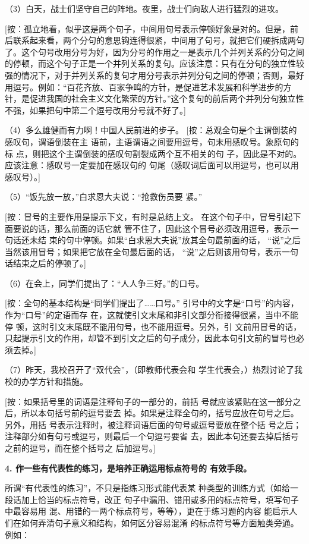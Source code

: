 （3）白天，战士们坚守自己的阵地。夜里，战士们向敌人进行猛烈的进攻。

[按：孤立地看，似乎这是两个句子，中间用句号表示停顿好象是对的。但是，前后联系起来看，两个分句的意思钩连得很紧，中间用了句号，就把它们硬拆成两句了。这个句号改用分号为好，因为分号的作用之一是表示几个并列关系的分句之间的停顿，而这个句子正是一个并列关系的复句。应该注意：只有在分句的独立性较强的情况下，对于并列关系的复句才用分号表示并列分句之间的停顿；否则，最好用逗号。例如：“百花齐放、百家争鸣的方针，是促进艺术发展和科学进步的方针，是促进我国的社会主义文化繁荣的方针。”这个复句的前后两个并列分句独立性不强，如果把句中第二个逗号改用分号就不好了。]

（4）多么雄健而有力啊！中国人民前进的步子。
[按：总观全句是个主谓倒装的感叹句，谓语倒装在主
语前，主语谓语之间要用逗号，句末用感叹号。象原句的标
点，则把这个主谓倒装的感叹句割裂成两个互不相关的句
子，因此是不对的。应该注意：感叹号一定要加在感叹句的
句尾（感叹词后面可以用逗号，也可以用感叹号）。]

（5）“饭先放一放，”白求恩大夫说：“抢救伤员要
紧。”

[按：冒号的主要作用是提示下文，有时是总结上文。
在这个句子中，冒号引起下面要说的话，那么前面的话它就
管不住了，因此这个冒号必须改用逗号，表示一句话还未结
束的句中停顿。如果“白求恩大夫说”放其全句最前面的话，
“说”之后当然该用冒号；如果把它放在全句最后面的话，
“说”之后则该用句号，表示一句话结束之后的停顿了。]

（6）在会上，同学们提出了：“人人争三好。”的口号。

[按：全句的基本结构是“同学们提出了……口号。”
引号中的文字是“口号”的内容，作为“口号”的定语而存
在，这就使引文末尾和非引文部分衔接得很紧，当中不能停
顿，这时引文末尾既不能用句号，也不能用逗号。另外，引
文前用冒号的话，只起提示引文的作用，却管不到引文之后的句子成分，因此本句引文前的冒号也必须去掉。]

（7）昨天，我校召开了“双代会”，（即教师代表会和
学生代表会，）热烈讨论了我校的办学方针和措施。

[按：如果括号里的词语是注释句子的一部分的，前括
号就应该紧贴在这一部分之后，所以本句括号前的逗号要去
掉。如果是注释全句的，括号应放在句号之后。另外，用括
号表示注释时，被注释词语后面的句号或逗号要放在整个括
号之后；注释部分如有句号或逗号，则最后一个句逗号要省
去，因此本句还要去掉后括号之前的逗号，而在整个括号之
后加逗号。]

\textbf{4. 作一些有代表性的练习，是培养正确运用标点符号的
有效手段。}

所谓“有代表性的练习”，不只是指练习形式能代表某
种类型的训练方式（如给一段话加上恰当的标点符号，改正
句子中漏用、错用或多用的标点符号，填写句子中最容易用
混、用错的一两个标点符号，等等），更在于练习题的内容
能启示人们在如何弄清句子意义和结构，如何区分容易混淆
的标点符号等方面触类旁通。例如：

